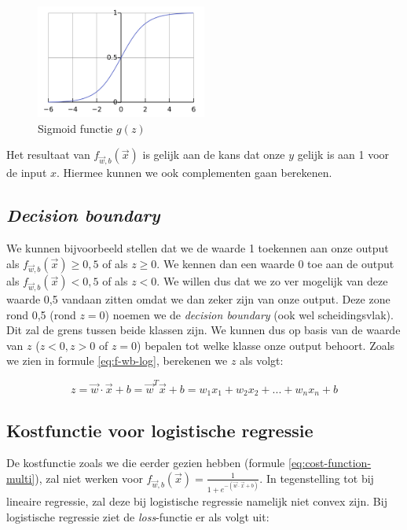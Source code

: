 \begin{figure}[h]
	\centering
	\includegraphics[width=0.5\textwidth]{images/9-sigmoid-function.png}
	\caption{Sigmoid functie $g(z)$}
	\label{fig:sigmoid}
\end{figure}
\noindent
Het resultaat van $f_{\vec{w},b}(\vec{x})$ is gelijk aan de kans dat onze $y$ gelijk is aan 1 voor de input $x$. Hiermee kunnen we ook complementen gaan berekenen. 

\subsection{\textit{Decision boundary}}

We kunnen bijvoorbeeld stellen dat we de waarde 1 toekennen aan onze output als $f_{\vec{w},b}(\vec{x}) \geq 0,5$ of als $z \geq 0$. We kennen dan een waarde 0 toe aan de output als $f_{\vec{w},b}(\vec{x}) < 0,5$ of als $z < 0$. We willen dus dat we zo ver mogelijk van deze waarde 0,5 vandaan zitten omdat we dan zeker zijn van onze output. Deze zone rond 0,5 (rond $z = 0$) noemen we de \textit{decision boundary} (ook wel scheidingsvlak). Dit zal de grens tussen beide klassen zijn. We kunnen dus op basis van de waarde van $z$ ($z < 0, z > 0$ of $z = 0$) bepalen tot welke klasse onze output behoort. Zoals we zien in formule \ref{eq:f-wb-log}, berekenen we $z$ als volgt:

\begin{equation}
	z = \vec{w} \cdot \vec{x} + b = \vec{w}^{T}\vec{x} + b = w_{1}x_{1} + w_{2}x_{2} + ... + w_{n}x_{n} + b
\end{equation}

\subsection{Kostfunctie voor logistische regressie}

De kostfunctie zoals we die eerder gezien hebben (formule \ref{eq:cost-function-multi}), zal niet werken voor $f_{\vec{w},b}(\vec{x}) = \frac{1}{1 + e^{-(\vec{w} \cdot \vec{x} + b)}}$. In tegenstelling tot bij lineaire regressie, zal deze bij logistische regressie namelijk niet convex zijn. Bij logistische regressie ziet de \textit{loss}-functie er als volgt uit:

